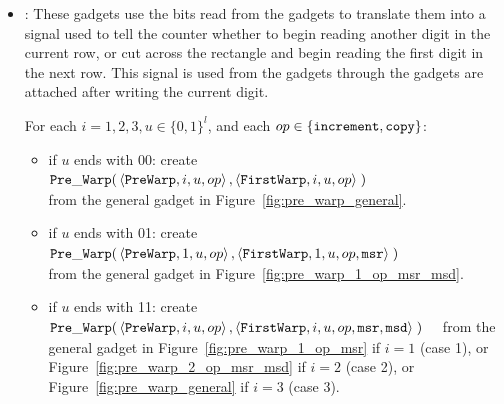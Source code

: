 \begin{itemize}

    \item {\prewarp}: These gadgets use the bits read from the {\cread} gadgets to translate them into
                      a signal used to tell the counter whether to begin reading
                      another digit in the current row, or cut across the rectangle and begin reading the
                      first digit in the next row. This signal is used from the {\prewarp} gadgets through
                      the {\dtop} gadgets are attached after writing the current digit.

    For each $i = 1,2,3, u \in \{0, 1\}^l$, and each $op \in \{ {\tt increment, copy } \}$:
    \begin{itemize}

        \item if $u$ ends with 00:
        create
        $\begin{aligned}[t]
            {\tt Pre\_Warp}(& \left\langle {\tt PreWarp},   i, u, op \right\rangle,
                       \left\langle {\tt FirstWarp}, i, u, op \right\rangle \;)
        \end{aligned}$ \\ from the general gadget in Figure~\ref{fig:pre_warp_general}.

        \item if $u$ ends with 01:
        create
        $\begin{aligned}[t]
            {\tt Pre\_Warp}(& \left\langle {\tt PreWarp},   1, u, op            \right\rangle,
                       \left\langle {\tt FirstWarp}, 1, u, op, {\tt msr} \right\rangle \;)
        \end{aligned}$ \\ from the general gadget in Figure~\ref{fig:pre_warp_1_op_msr_msd}.


        \item if $u$ ends with 11:
        create
        $\begin{aligned}[t]
            {\tt Pre\_Warp}(& \left\langle {\tt PreWarp},   i, u, op                       \right\rangle,
                       \left\langle {\tt FirstWarp}, i, u, op, {\tt msr}, {\tt msd} \right\rangle \;)
        \end{aligned}$ from the general gadget in Figure~\ref{fig:pre_warp_1_op_msr} if $i = 1$ (case 1),
        or Figure~\ref{fig:pre_warp_2_op_msr_msd} if $i = 2$ (case 2), or Figure~\ref{fig:pre_warp_general} if $i = 3$ (case 3).
    \end{itemize}
    \vspace{.5cm}


\end{itemize}
